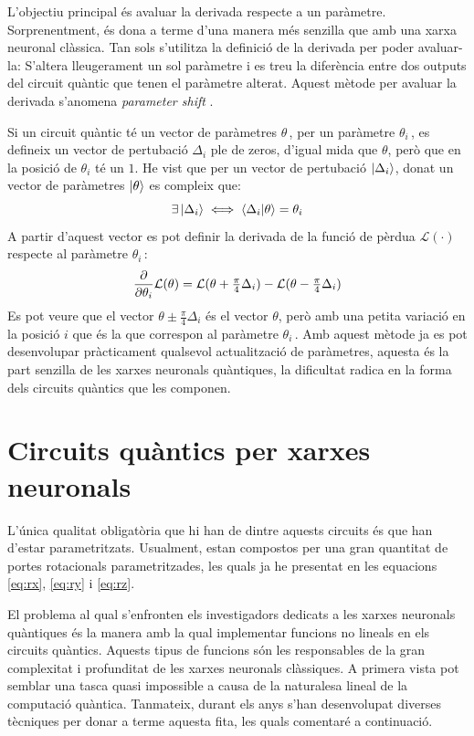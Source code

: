 L'objectiu principal és avaluar la derivada respecte a un paràmetre. Sorprenentment, és dona a terme d'una manera més senzilla que amb una xarxa neuronal clàssica. Tan sols s'utilitza la definició de la derivada per poder avaluar-la: S'altera lleugerament un sol paràmetre i es treu la diferència entre dos outputs del circuit quàntic que tenen el paràmetre alterat. Aquest mètode per avaluar la derivada s'anomena \textit{parameter shift} \cite{tfq, shift_parameter_harrow_2019}.

Si un circuit quàntic té un vector de paràmetres $\theta\,$, per un paràmetre $\theta_{i}\,$, es defineix un vector de pertubació $\Delta_i$ ple de zeros, d'igual mida que $\theta$, però que en la posició de $\theta_i$ té un $1$. He vist que per un vector de pertubació $\ket{\Delta_{i}}$, donat un vector de paràmetres $\ket{\theta}$ es compleix que:
\begin{equation*}
	\exists \ket{\Delta_{i}} \iff \bra{\Delta_{i}}\ket{\theta} = \theta_i
\end{equation*}
A partir d'aquest vector es pot definir la derivada de la funció de pèrdua $\mathcal{L}(\cdot)$ respecte al paràmetre $\theta_{i}\,$:
$$
\pdv{\theta_i} \mathcal{L}(\theta) = \mathcal{L}(\theta + \tfrac{\pi}{4}\Delta_i) - \mathcal{L}(\theta - \tfrac{\pi}{4}\Delta_i)
$$
Es pot veure que el vector $\theta \pm \frac{\pi}{4}\Delta_i$ és el vector $\theta$, però amb una petita variació en la posició $i$ que és la que correspon al paràmetre $\theta_i\,$. Amb aquest mètode ja es pot desenvolupar pràcticament qualsevol actualització de paràmetres, aquesta és la part senzilla de les xarxes neuronals quàntiques, la dificultat radica en la forma dels circuits quàntics que les componen.

\section{Circuits quàntics per xarxes neuronals}
\label{qcircuits}
L'única qualitat obligatòria que hi han de dintre aquests circuits és que han d'estar parametritzats. Usualment, estan compostos per una gran quantitat de portes rotacionals parametritzades, les quals ja he presentat en les equacions \ref{eq:rx}, \ref{eq:ry} i \ref{eq:rz}.

El problema al qual s'enfronten els investigadors dedicats a les xarxes neuronals quàntiques és la manera amb la qual implementar funcions no lineals en els circuits quàntics. Aquests tipus de funcions són les responsables de la gran complexitat i profunditat de les xarxes neuronals clàssiques. A primera vista pot semblar una tasca quasi impossible a causa de la naturalesa lineal de la computació quàntica. Tanmateix, durant els anys s'han desenvolupat diverses tècniques per donar a terme aquesta fita, les quals comentaré a continuació.

